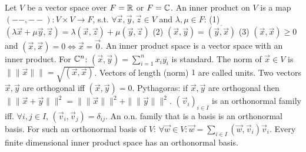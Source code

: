  Let $V$ be a vector space over $F=\mathbb{R}$ or $F=\mathbb{C}$.
An inner product on $V$ is a map $(--,--) : V \times V \to F$,
s.t. $\forall \vec{x}, \vec{y}, \vec{z} \in V$ and $\lambda, \mu \in F$:
(1) $(\lambda \vec{x} + \mu \vec{y}, \vec{z}) = \lambda(\vec{x}, \vec{z}) + \mu(\vec{y}, \vec{z})$
(2) $(\vec{x}, \vec{y}) = \overline{(\vec{y}, \vec{x})}$
(3) $(\vec{x}, \vec{x}) \ge 0$ and $(\vec{x}, \vec{x}) = 0 \iff \vec{x} = \vec{0}$.
An inner product space is a vector space with an inner product.
For $\mathbb{C}^n$: $(\vec{x}, \vec{y}) = \sum_{i=1}^n x_i \overline{y_i}$ is standard.
 The norm of $\vec{x} \in V$ is $\|\|\vec{x}\|\| = \sqrt{(\vec{x}, \vec{x})}$.
Vectors of length (norm) $1$ are called units.
Two vectors $\vec{x}, \vec{y}$ are orthogonal iff $(\vec{x}, \vec{y}) = 0$.
Pythagoras: if $\vec{x}, \vec{y}$ are orthogonal then $\|\|\vec{x} + \vec{y}\|\|^2 = \|\|\vec{x}\|\|^2 + \|\|\vec{y}\|\|^2$.
 $(\vec{v}_i)_{i \in I}$ is an orthonormal family iff. $\forall i, j \in I$, $(\vec{v}_i, \vec{v}_j) = \delta_{ij}$.
An o.n. family that is a basis is an orthonormal basis.
For such an orthonormal basis of $V$: $\forall \vec{w} \in V: \vec{w} = \sum_{i \in I} (\vec{w}, \vec{v}_i) \vec{v}_i$.
 Every finite dimensional inner product space has an orthonormal basis.
